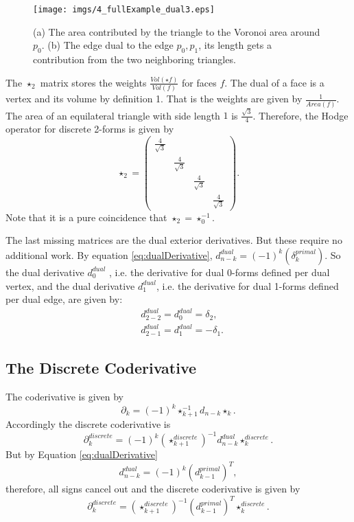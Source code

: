 \begin{figure}%
\begin{center}
\texttt{[image: imgs/4\_fullExample\_dual3.eps]}%
\end{center}
\caption{(a) The area contributed by the triangle to the Voronoi area around $p_0$. (b) The edge dual to the edge $p_0,p_1$, its length gets a contribution from the two neighboring triangles.}%
\label{fig:4_fullexample_dual3}%
\end{figure}

The $\star_2$ matrix stores the weights $\frac{Vol(\star f)}{Vol(f)}$ for faces $f$. The dual of a face is a vertex and its volume by definition 1. That is the weights are given by $\frac{1}{Area(f)}$. The area of an equilateral triangle with side length $1$ is $\frac{\sqrt{3}}{4}$. Therefore, the Hodge operator for discrete 2-forms is given by
\[\star_2= \begin{pmatrix}
	\frac{4}{\sqrt{3}} & & & \\
	& \frac{4}{\sqrt{3}}  & & \\
	& & \frac{4}{\sqrt{3}} & \\
	& & &\frac{4}{\sqrt{3}} 
\end{pmatrix}.\]
Note that it is a pure coincidence that $\star_2 = \star_0 ^{-1}$.

The last missing matrices are the dual exterior derivatives. But these require no additional work. By equation \ref{eq:dualDerivative}, $d^{dual}_{n-k}= (-1)^k(\delta_k^{primal})$. So the dual derivative $d_0^{dual}$ , i.e. the derivative for dual 0-forms defined per dual vertex, and the dual derivative $d_1^{dual}$, i.e. the derivative for dual 1-forms defined per dual edge, are given by:
\begin{align*} &d^{dual}_{2-2} = d^{dual}_{0} = \delta_2,\\
&d^{dual}_{2-1} = d^{dual}_{1} = -\delta_1.\end{align*}


\subsection{The Discrete Coderivative}

The coderivative is given by
\[\partial_k =(-1)^k\star_{k+1}^{-1}d_{n-k}\star_k.\]
Accordingly the discrete coderivative is 
\[\partial_k^{discrete} =(-1)^k(\star_{k+1}^{discrete})^{-1}d_{n-k}^{dual}\star_k^{discrete}.\]
But by Equation \ref{eq:dualDerivative} 
$$d_{n-k}^{dual} = (-1)^k(d_{k-1}^{primal})^T,$$
therefore, all signs cancel out and the discrete coderivative is given by
\begin{equation}
\partial_k^{discrete} =(\star_{k+1}^{discrete})^{-1}(d_{k-1}^{primal})^T\star_k^{discrete}
\label{eq:discreteCoder}.
\end{equation}

